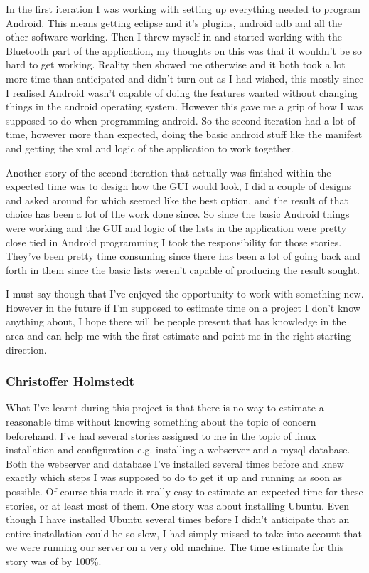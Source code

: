 In the first iteration I was working with setting up everything needed to program Android. This means getting eclipse and it's plugins, android adb and all the other software working. 
Then I threw myself in and started working with the Bluetooth part of the application, my thoughts on this was that it wouldn't be so hard to get working. 
Reality then showed me otherwise and it both took a lot more time than anticipated and didn't turn out as I had wished,
this mostly since I realised Android wasn't capable of doing the features wanted without changing things in the android operating system. However this gave me a grip of how I was supposed to
do when programming android. So the second iteration had a lot of time, however more than expected, doing the basic android stuff like the manifest and getting the xml and logic of the application to work together.

Another story of the second iteration that actually was finished within the expected time was to design how the GUI would look, I did a couple of designs and asked around for which seemed like the best option, and
the result of that choice has been a lot of the work done since. So since the basic Android things were working and the GUI and logic of the lists in 
the application were pretty close tied in Android programming I took the responsibility for those stories. They've been pretty time consuming since there has been a lot of going back and forth in them since the 
basic lists weren't capable of producing the result sought.

I must say though that I've enjoyed the opportunity to work with something new. However in the future if I'm supposed to estimate time on a project I don't know anything about, I hope 
there will be people present that has knowledge in the area and can help me with the first estimate and point me in the right starting direction.

\subsubsection{Christoffer Holmstedt}
What I've learnt during this project is that there is no way to estimate a reasonable time without knowing something about the topic of concern beforehand.
I've had several stories assigned to me in the topic of linux installation and configuration e.g. installing a webserver and a mysql database.
Both the webserver and database I've installed several times before and knew exactly which steps I was supposed to do to get it up and running as soon as possible.
Of course this made it really easy to estimate an expected time for these stories, or at least most of them.
One story was about installing Ubuntu.
Even though I have installed Ubuntu several times before I didn't anticipate that an entire installation could be so slow, I had simply missed to take into account that we were running our server on a very old machine.
The time estimate for this story was of by 100\%.

